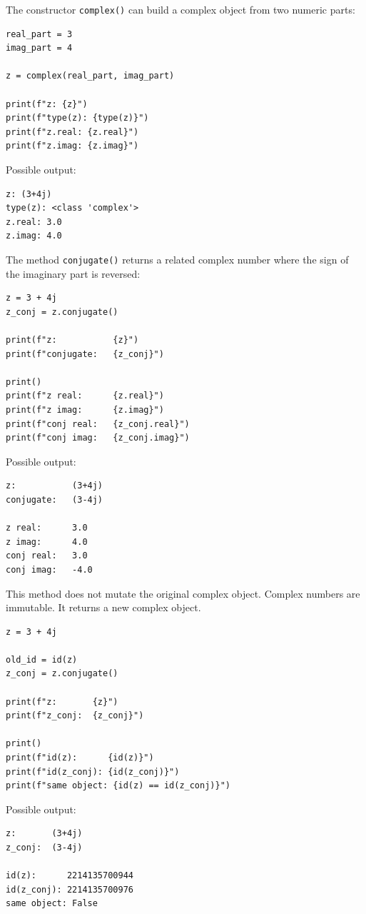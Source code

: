 The constructor \texttt{complex()} can build a complex object from two numeric parts:

\begin{verbatim}
real_part = 3
imag_part = 4

z = complex(real_part, imag_part)

print(f"z: {z}")
print(f"type(z): {type(z)}")
print(f"z.real: {z.real}")
print(f"z.imag: {z.imag}")
\end{verbatim}

Possible output:

\begin{verbatim}
z: (3+4j)
type(z): <class 'complex'>
z.real: 3.0
z.imag: 4.0
\end{verbatim}

The method \texttt{conjugate()} returns a related complex number where the sign of the imaginary part is reversed:

\begin{verbatim}
z = 3 + 4j
z_conj = z.conjugate()

print(f"z:           {z}")
print(f"conjugate:   {z_conj}")

print()
print(f"z real:      {z.real}")
print(f"z imag:      {z.imag}")
print(f"conj real:   {z_conj.real}")
print(f"conj imag:   {z_conj.imag}")
\end{verbatim}

Possible output:

\begin{verbatim}
z:           (3+4j)
conjugate:   (3-4j)

z real:      3.0
z imag:      4.0
conj real:   3.0
conj imag:   -4.0
\end{verbatim}

This method does not mutate the original complex object. Complex numbers are immutable. It returns a new complex object.

\begin{verbatim}
z = 3 + 4j

old_id = id(z)
z_conj = z.conjugate()

print(f"z:       {z}")
print(f"z_conj:  {z_conj}")

print()
print(f"id(z):      {id(z)}")
print(f"id(z_conj): {id(z_conj)}")
print(f"same object: {id(z) == id(z_conj)}")
\end{verbatim}

Possible output:

\begin{verbatim}
z:       (3+4j)
z_conj:  (3-4j)

id(z):      2214135700944
id(z_conj): 2214135700976
same object: False
\end{verbatim}

